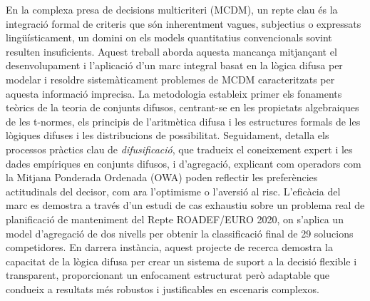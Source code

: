 \newpage
\begin{poliabstract}[Resum]
    En la complexa presa de decisions multicriteri (MCDM), un repte clau és la integració formal de criteris que són inherentment vagues, subjectius o expressats lingüísticament, un domini on els models quantitatius convencionals sovint resulten insuficients. Aquest treball aborda aquesta mancança mitjançant el desenvolupament i l'aplicació d'un marc integral basat en la lògica difusa per modelar i resoldre sistemàticament problemes de MCDM caracteritzats per aquesta informació imprecisa. La metodologia estableix primer els fonaments teòrics de la teoria de conjunts difusos, centrant-se en les propietats algebraiques de les t-normes, els principis de l'aritmètica difusa i les estructures formals de les lògiques difuses i les distribucions de possibilitat. Seguidament, detalla els processos pràctics clau de \textit{difusificació}, que tradueix el coneixement expert i les dades empíriques en conjunts difusos, i d'agregació, explicant com operadors com la Mitjana Ponderada Ordenada (OWA) poden reflectir les preferències actitudinals del decisor, com ara l'optimisme o l'aversió al risc. L'eficàcia del marc es demostra a través d'un estudi de cas exhaustiu sobre un problema real de planificació de manteniment del Repte ROADEF/EURO 2020, on s'aplica un model d'agregació de dos nivells per obtenir la classificació final de 29 solucions competidores. En darrera instància, aquest projecte de recerca demostra la capacitat de la lògica difusa per crear un sistema de suport a la decisió flexible i transparent, proporcionant un enfocament estructurat però adaptable que condueix a resultats més robustos i justificables en escenaris complexos.
\end{poliabstract}
